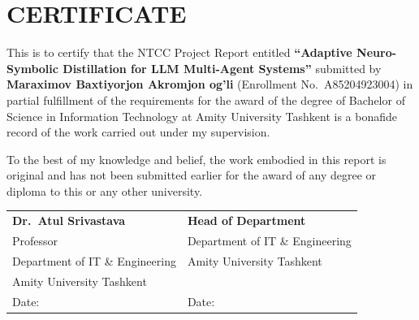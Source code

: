 \chapter*{CERTIFICATE}

This is to certify that the NTCC Project Report entitled \textbf{``Adaptive Neuro-Symbolic
Distillation for LLM Multi-Agent Systems''} submitted by \textbf{Maraximov Baxtiyorjon
Akromjon og'li} (Enrollment No.\ A85204923004) in partial fulfillment of the requirements for
the award of the degree of Bachelor of Science in Information Technology at Amity University
Tashkent is a bonafide record of the work carried out under my supervision.

To the best of my knowledge and belief, the work embodied in this report is original and has
not been submitted earlier for the award of any degree or diploma to this or any other
university.

\vspace{3cm}

\noindent
\begin{tabular}{ll}
\textbf{Dr.\ Atul Srivastava} & \hspace{4cm} \textbf{Head of Department} \\
Professor & \hspace{4cm} Department of IT \& Engineering \\
Department of IT \& Engineering & \hspace{4cm} Amity University Tashkent \\
Amity University Tashkent & \\[1cm]
Date: \underline{\hspace{3cm}} & \hspace{4cm} Date: \underline{\hspace{3cm}}
\end{tabular}
